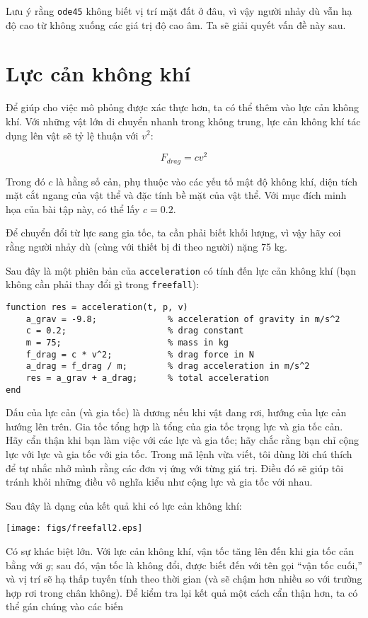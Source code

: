 \documentclass[12pt]{book}
\begin{document}
Lưu ý rằng {\tt ode45} không biết vị trí mặt đất ở đâu, vì vậy
người nhảy dù vẫn hạ độ cao từ không xuống các giá trị độ cao
âm. Ta sẽ giải quyết vấn đề này sau.


\section{Lực cản không khí}

Để giúp cho việc mô phỏng được xác thực hơn, ta có thể thêm vào
lực cản không khí. Với những vật lớn di chuyển nhanh trong không
trung, lực cản không khí tác dụng lên vật sẽ tỷ lệ thuận với $v^2$:

\[ F_{drag} = c v^2 \]

Trong đó $c$ là hằng số cản, phụ thuộc vào các yếu tố mật độ 
không khí, diện tích mặt cắt ngang của vật thể và đặc tính bề mặt
của vật thể. Với mục đích minh họa của bài tập này, có thể lấy $c = 0.2$.

Để chuyển đổi từ lực sang gia tốc, ta cần phải biết khối lượng, vì vậy
hãy coi rằng người nhảy dù (cùng với thiết bị đi theo người) nặng 75 kg.

Sau đây là một phiên bản của {\tt acceleration} có tính đến lực cản
không khí (bạn không cần phải thay đổi gì trong {\tt freefall}):

\begin{verbatim}
function res = acceleration(t, p, v)
    a_grav = -9.8;              % acceleration of gravity in m/s^2
    c = 0.2;                    % drag constant
    m = 75;                     % mass in kg
    f_drag = c * v^2;           % drag force in N
    a_drag = f_drag / m;        % drag acceleration in m/s^2
    res = a_grav + a_drag;      % total acceleration
end
\end{verbatim}
%
Dấu của lực cản (và gia tốc) là dương nếu khi vật đang rơi, hướng
của lực cản hướng lên trên. Gia tốc tổng hợp là tổng của gia tốc
trọng lực và gia tốc cản. Hãy cẩn thận khi bạn làm việc với các
lực và gia tốc; hãy chắc rằng bạn chỉ cộng lực với lực và gia tốc
với gia tốc. Trong mã lệnh vừa viết, tôi dùng lời chú thích để tự
nhắc nhở mình rằng các đơn vị ứng với từng giá trị. Điều đó sẽ
giúp tôi tránh khỏi những điều vô nghĩa kiểu như cộng lực và
gia tốc với nhau.

Sau đây là dạng của kết quả khi có lực cản không khí:

\centerline{\texttt{[image: figs/freefall2.eps]}}

Có sự khác biệt lớn. Với lực cản không khí, vận tốc tăng lên
đến khi gia tốc cản bằng với $g$; sau đó, vận tốc là không đổi,
được biết đến với tên gọi ``vận tốc cuối,'' và vị trí sẽ hạ thấp
tuyến tính theo thời gian (và sẽ chậm hơn nhiều so với trường hợp
rơi trong chân không). Để kiểm tra lại kết quả một cách cẩn thận
hơn, ta có thể gán chúng vào các biến
\end{document}
